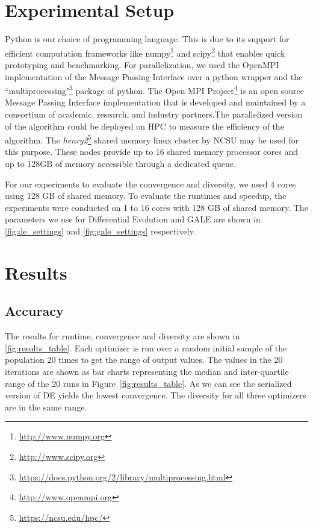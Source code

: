 \documentclass[conference]{IEEEtran}
\newcommand{\fig}[1]{Figure~\ref{fig:#1}}
\begin{document}
	\section{Experimental Setup}
	\label{experiments}
	Python is our choice of programming language. This is due to its support for efficient computation frameworks like numpy\footnote{\url{http://www.numpy.org}} and scipy\footnote{\url{http://www.scipy.org}} that enables quick prototyping and benchmarking.
	For parallelization,  we used the OpenMPI implementation of the Message Passing Interface over a python wrapper and the ``multiprocessing"\footnote{\url{https://docs.python.org/2/library/multiprocessing.html}} package of python. The Open MPI Project\footnote{\url{http://www.openmpi.org}} is an open source Message Passing Interface implementation that is developed and maintained by a consortium of academic, research, and industry partners.The parallelized version of the algorithm could be deployed on HPC to measure the efficiency of the algorithm. The \textit{henry2}\footnote{\url{https://ncsu.edu/hpc/}} shared memory linux cluster by NCSU may be used for this purpose. These nodes provide up to 16 shared memory processor cores and up to 128GB of memory accessible through a dedicated queue. 
	
	For our experiments to evaluate the convergence and diversity, we used 4 cores using 128 GB of shared memory. To evaluate the runtimes and speedup, the experiments were conducted on 1 to 16 cores with 128 GB of shared memory. The parameters we use for Differential Evolution and GALE are shown in \ref{fig:de_settings} and \ref{fig:gale_settings} respectively.
	
	
	\section{Results}
	\label{results}
	
	\subsection{Accuracy}
	The results for runtime, convergence and diversity are shown in \ref{fig:results_table}. Each optimizer is run over a random initial sample of the population 20 times to get the range of output values. The values in the 20 iterations are shown as bar charts representing the median and inter-quartile range of the 20 runs in \fig{results_table}.  As we can see the serialized version of DE yields the lowest convergence. The diversity for all three optimizers are in the same range.
	
\end{document}
